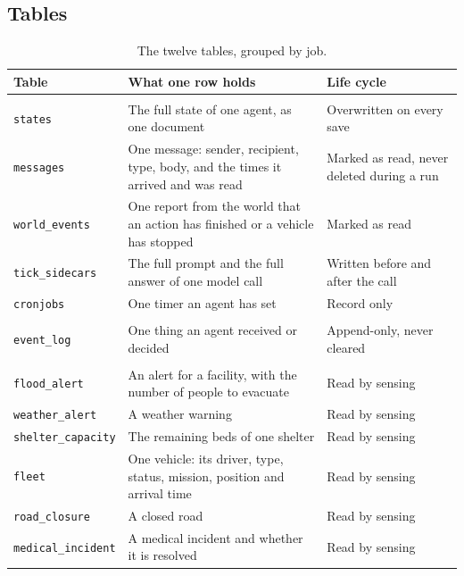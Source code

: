

\subsection{Tables}
\label{sec:data:schema}

\begin{table}[htbp]
\centering
\caption{The twelve tables, grouped by job.}
\label{tab:data:tables}
\small
\begin{tabularx}{\textwidth}{>{\raggedright\arraybackslash}p{3.7cm}>{\raggedright\arraybackslash}X>{\raggedright\arraybackslash}p{3.0cm}}
\toprule
Table & What one row holds & Life cycle \\
\midrule
\multicolumn{3}{l}{\emph{Runtime}} \\
\texttt{states} & The full state of one agent, as one document & Overwritten on every save \\
\texttt{messages} & One message: sender, recipient, type, body, and the times it arrived and was read & Marked as read, never deleted during a run \\
\texttt{world\_events} & One report from the world that an action has finished or a vehicle has stopped & Marked as read \\
\texttt{tick\_sidecars} & The full prompt and the full answer of one model call & Written before and after the call \\
\texttt{cronjobs} & One timer an agent has set & Record only \\
\midrule
\multicolumn{3}{l}{\emph{Audit}} \\
\texttt{event\_log} & One thing an agent received or decided & Append-only, never cleared \\
\midrule
\multicolumn{3}{l}{\emph{Sensing}} \\
\texttt{flood\_alert} & An alert for a facility, with the number of people to evacuate & Read by sensing \\
\texttt{weather\_alert} & A weather warning & Read by sensing \\
\texttt{shelter\_capacity} & The remaining beds of one shelter & Read by sensing \\
\texttt{fleet} & One vehicle: its driver, type, status, mission, position and arrival time & Read by sensing \\
\texttt{road\_closure} & A closed road & Read by sensing \\
\texttt{medical\_incident} & A medical incident and whether it is resolved & Read by sensing \\
\bottomrule
\end{tabularx}
\end{table}

